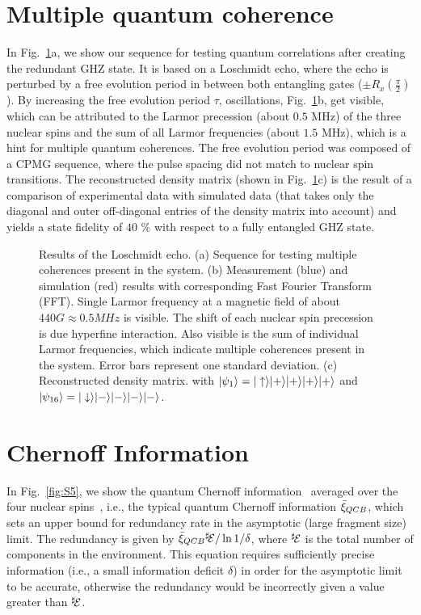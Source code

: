 \documentclass[aps,floatfix,footinbib,superscriptaddress]{revtex4-1}
\begin{document}
\section{Multiple quantum coherence}

In Fig.~\ref{fig:S4}a, we show our sequence for testing quantum correlations after creating the redundant GHZ state. It is based on a Loschmidt echo, where the echo is perturbed by a free evolution period in between both entangling gates ($\pm R_x(\frac{\pi}{2})$). By increasing the free evolution period $\tau$, oscillations, Fig.~\ref{fig:S4}b, get visible, which can be attributed to the Larmor precession (about $0.5$ MHz) of the three nuclear spins and the sum of all Larmor frequencies (about $1.5$ MHz), which is a hint for multiple quantum coherences. The free evolution period was composed of a CPMG sequence, where the pulse spacing did not match to nuclear spin transitions. The reconstructed density matrix (shown in Fig.~\ref{fig:S4}c) is the result of a comparison of experimental data with simulated data (that takes only the diagonal and outer off-diagonal entries of the density matrix into account) and yields a state fidelity of $40$ \% with respect to a fully entangled GHZ state. 

\begin{figure}[H]
\centerline{}
\caption{Results of the Loschmidt echo. (a) Sequence for testing multiple coherences present in the system. (b) Measurement (blue) and simulation (red) results with corresponding Fast Fourier Transform (FFT). Single Larmor frequency at a magnetic field of about $440G\approx 0.5 MHz$ is visible. The shift of each nuclear spin precession is due hyperfine interaction. Also visible is the sum of individual Larmor frequencies, which indicate multiple coherences present in the system. Error bars represent one standard deviation. (c) Reconstructed density matrix. with $|\psi_1\rangle=|\uparrow\rangle|+\rangle|+\rangle|+\rangle|+\rangle$ and  $|\psi_{16}\rangle=|\downarrow\rangle|-\rangle|-\rangle|-\rangle|-\rangle$.}
\label{fig:S4}
\end{figure}

\section{Chernoff Information}

In Fig.~\ref{fig:S5}, we show the quantum Chernoff information~\cite{Audenaert07} averaged over the four nuclear spins~\cite{Zwolak14,zwolak16}, i.e., the typical quantum Chernoff information $\bar{\xi}_{QCB}$, which sets an upper bound for redundancy rate in the asymptotic (large fragment size) limit. The redundancy is given by $\bar{\xi}_{QCB} {^{\sharp}}\hspace{-0.5mm}\mathcal{E} / \ln 1/\delta$, where ${^{\sharp}}\hspace{-0.5mm}\mathcal{E}$ is the total number of components in the environment. This equation requires sufficiently precise information (i.e., a small information deficit $\delta$) in order for the asymptotic limit to be accurate, otherwise the redundancy would be incorrectly given a value greater than ${^{\sharp}}\hspace{-0.5mm}\mathcal{E}$. 
\end{document}
